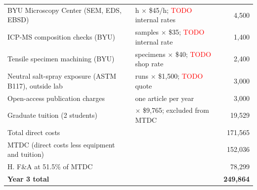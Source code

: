 \begin{longtable}{@{}>{\raggedright\arraybackslash}p{2.6in}>{\raggedright\arraybackslash}p{2.75in}r@{}}
BYU Microscopy Center (SEM, EDS, EBSD) & 100 h $\times$ \$45/h; \textcolor{red}{TODO} internal rates & 4,500 \\
ICP-MS composition checks (BYU) & 40 samples $\times$ \$35; \textcolor{red}{TODO} internal rate & 1,400 \\
Tensile specimen machining (BYU) & 60 specimens $\times$ \$40; \textcolor{red}{TODO} shop rate & 2,400 \\
Neutral salt-spray exposure (ASTM B117), outside lab & 2 runs $\times$ \$1,500; \textcolor{red}{TODO} quote & 3,000 \\
Open-access publication charges & one article per year & 3,000 \\
Graduate tuition (2 students) & 2 $\times$ \$9,765; excluded from MTDC & 19,529 \\
\midrule
Total direct costs & & 171,565 \\
MTDC (direct costs less equipment and tuition) & & 152,036 \\
H. F\&A at 51.5\% of MTDC & & 78,299 \\
\textbf{Year 3 total} & & \textbf{249,864} \\
\bottomrule
\end{longtable}
